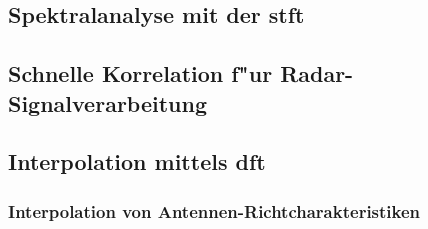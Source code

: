 \subsection{Spektralanalyse mit der \texorpdfstring{\acrlong*{stft}}{STFT}}\label{sec:stft}
%

%
\ENDDOCUMENT
%
\subsection{Schnelle Korrelation f"ur Radar-Signalverarbeitung}\label{sec:mseq}
%

%
\subsection{Interpolation mittels \texorpdfstring{\acrshort*{dft}}{DFT}}\label{sec:dftintp}
%

%
\subsubsection{Interpolation von Antennen-Richtcharakteristiken}\label{sec:eadf}
%
